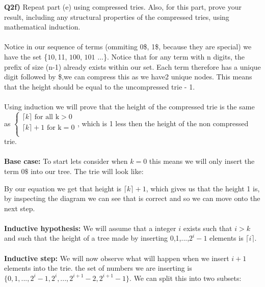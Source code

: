 \documentclass[12pt]{article}
\begin{document}
\begin{adjustwidth}{0em}{0pt}
\textbf{Q2f)} Repeat part (e) using compressed tries. Also, for this part, prove your result, including any structural properties of the compressed tries, using mathematical induction. \\\\
Notice in our sequence of terms (ommiting 0\$, 1\$, because they are special) we have the set \{$10, $11, $100$, $101$ ...\}. Notice that for any term with n digits, the prefix of size (n-1) already exists within our set. Each term therefore has a unique digit followed by \$,we can compress this as we have2 unique nodes. This means that the height should be equal to the uncompressed trie - 1.\\\\
Using induction we will prove that the height of the compressed trie is the same as $\begin{cases}
\lceil k \rceil \text{ for all k} > 0\\
\lceil k \rceil + 1 \text{ for k} = 0\\
\end{cases}$, which is 1 less then the height of the non compressed trie.\\\\
\textbf{Base case:} To start lets consider when $k=0$ this means we will only insert the term $0\$$ into our tree. The trie will look like:
\begin{center}
\end{center}
By our equation we get that height is $\lceil k \rceil + 1$, which gives us that the height 1 is, by inspecting the diagram we can see that is correct and so we can move onto the next step.\\\\
\textbf{Inductive hypothesis:} We will assume that a integer $i$ exists such that $i > k$ and such that the height of a tree made by inserting 0,1,...,$2^i-1$ elements is $\lceil i \rceil$. \\\\
\textbf{Inductive step:} We will now observe what will happen when we insert $i+1$ elements into the trie. the set of numbers we are inserting is $\{ 0, 1, ..., 2^i-1, 2^i, ..., 2^{i+1}-2, 2^{i+1}-1\}$. We can split this into two subsets:

\end{adjustwidth}
\end{document}
